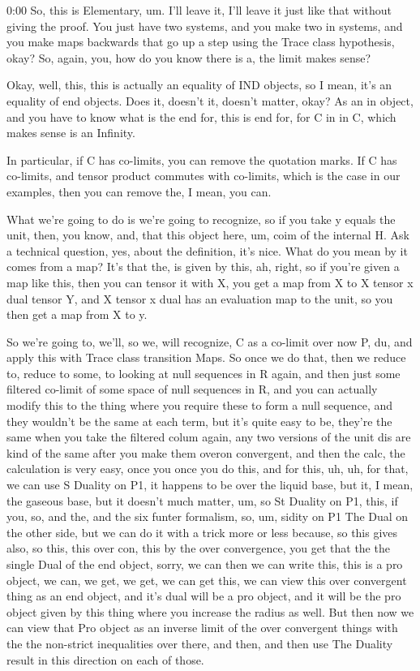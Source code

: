 \begin{unfinished}{0:00}
So, this is Elementary, um. I'll leave it, I'll leave it just like that without giving the proof. You just have two systems, and you make two in systems, and you make maps backwards that go up a step using the Trace class hypothesis, okay? So, again, you, how do you know there is a, the limit makes sense?

Okay, well, this, this is actually an equality of IND objects, so I mean, it's an equality of end objects. Does it, doesn't it, doesn't matter, okay? As an in object, and you have to know what is the end for, this is end for, for C in in C, which makes sense is an Infinity.

In particular, if C has co-limits, you can remove the quotation marks. If C has co-limits, and tensor product commutes with co-limits, which is the case in our examples, then you can remove the, I mean, you can.

What we're going to do is we're going to recognize, so if you take y equals the unit, then, you know, and, that this object here, um, coim of the internal H. Ask a technical question, yes, about the definition, it's nice. What do you mean by it comes from a map? It's that the, is given by this, ah, right, so if you're given a map like this, then you can tensor it with X, you get a map from X to X tensor x dual tensor Y, and X tensor x dual has an evaluation map to the unit, so you then get a map from X to y.

So we're going to, we'll, so we, will recognize, C as a co-limit over now P, du, and apply this with Trace class transition Maps. So once we do that, then we reduce to, reduce to some, to looking at null sequences in R again, and then just some filtered co-limit of some space of null sequences in R, and you can actually modify this to the thing where you require these to form a null sequence, and they wouldn't be the same at each term, but it's quite easy to be, they're the same when you take the filtered colum again, any two versions of the unit dis are kind of the same after you make them overon convergent, and then the calc, the calculation is very easy, once you once you do this, and for this, uh, uh, for that, we can use S Duality on P1, it happens to be over the liquid base, but it, I mean, the gaseous base, but it doesn't much matter, um, so St Duality on P1, this, if you, so, and the, and the six funter formalism, so, um, sidity on P1
The Dual on the other side, but we can do it with a trick more or less because, so this gives also, so this, this over con, this by the over convergence, you get that the the single Dual of the end object, sorry, we can then we can write this, this is a pro object, we can, we get, we get, we can get this, we can view this over convergent thing as an end object, and it's dual will be a pro object, and it will be the pro object given by this thing where you increase the radius as well. But then now we can view that Pro object as an inverse limit of the over convergent things with the the non-strict inequalities over there, and then, and then use The Duality result in this direction on each of those.


\end{unfinished}
